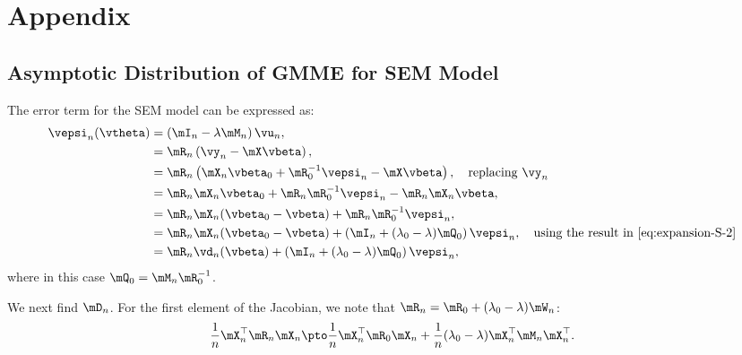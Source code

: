 \documentclass[english,12pt]{book}\usepackage[]{graphicx}\usepackage[]{xcolor}
\begin{document}
\section*{Appendix}


\begin{subappendices}

\section{Asymptotic Distribution of GMME for SEM Model}

The error term for the SEM model can be expressed as:
\begin{equation*}
\begin{aligned}
\vepsi_n(\vtheta) & = \left(\mI_n - \lambda\mM_n\right)\vu_n, \\
& = \mR_n\left(\vy_n - \mX\vbeta\right), \\
& = \mR_n\left(\mX_n\vbeta_0 + \mR_0^{-1}\vepsi_n - \mX\vbeta\right),\quad \mbox{replacing $\vy_n$} \\
& = \mR_n\mX_n\vbeta_0 + \mR_n\mR_0^{-1}\vepsi_n - \mR_n\mX_n\vbeta, \\
& = \mR_n\mX_n(\vbeta_0 - \vbeta) + \mR_n\mR_0^{-1}\vepsi_n, \\
& = \mR_n\mX_n(\vbeta_0 - \vbeta) + \left(\mI_n + (\lambda_0 - \lambda)\mQ_0\right)\vepsi_n, \quad \mbox{using the result in \eqref{eq:expansion-S-2}} \\
& = \mR_n\vd_n(\vbeta) + \left(\mI_n + (\lambda_0 - \lambda)\mQ_0\right)\vepsi_n,
\end{aligned}
\end{equation*}
%
where in this case $\mQ_0 = \mM_n\mR_0^{-1}$. 

We next find $\mD_n$. For the first element of the Jacobian, we note that $\mR_n = \mR_0 + (\lambda_0 - \lambda)\mW_n$:
\begin{equation*}
\frac{1}{n}\mX_n^\top\mR_n\mX_n \pto \frac{1}{n}\mX_n^\top\mR_0\mX_n +\frac{1}{n}(\lambda_0 - \lambda)\mX^\top_n\mM_n\mX_n^\top.
\end{equation*}


\end{subappendices}
\end{document}
